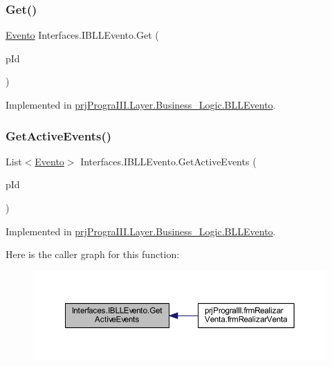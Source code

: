 \subsubsection{\texorpdfstring{Get()}{Get()}}
{\footnotesize\ttfamily \hyperlink{classprj_progra_i_i_i_1_1_layer_1_1_entities_1_1_evento}{Evento} Interfaces.\+I\+B\+L\+L\+Evento.\+Get (\begin{DoxyParamCaption}\item[{int}]{p\+Id }\end{DoxyParamCaption})}



Implemented in \hyperlink{classprj_progra_i_i_i_1_1_layer_1_1_business___logic_1_1_b_l_l_evento_a7aeead199812f2510ee3087a7d022c4e}{prj\+Progra\+I\+I\+I.\+Layer.\+Business\+\_\+\+Logic.\+B\+L\+L\+Evento}.

\hypertarget{interface_interfaces_1_1_i_b_l_l_evento_ace54abf5be3a6b759890104aeebd6d62}{}\label{interface_interfaces_1_1_i_b_l_l_evento_ace54abf5be3a6b759890104aeebd6d62} 
\subsubsection{\texorpdfstring{Get\+Active\+Events()}{GetActiveEvents()}}
{\footnotesize\ttfamily List$<$\hyperlink{classprj_progra_i_i_i_1_1_layer_1_1_entities_1_1_evento}{Evento}$>$ Interfaces.\+I\+B\+L\+L\+Evento.\+Get\+Active\+Events (\begin{DoxyParamCaption}\item[{Date\+Time}]{p\+Id }\end{DoxyParamCaption})}



Implemented in \hyperlink{classprj_progra_i_i_i_1_1_layer_1_1_business___logic_1_1_b_l_l_evento_a72838525485eaff7c98c698dac7e5f71}{prj\+Progra\+I\+I\+I.\+Layer.\+Business\+\_\+\+Logic.\+B\+L\+L\+Evento}.

Here is the caller graph for this function\+:
\nopagebreak
\begin{figure}[H]
\begin{center}
\leavevmode
\includegraphics[width=350pt]{interface_interfaces_1_1_i_b_l_l_evento_ace54abf5be3a6b759890104aeebd6d62_icgraph}
\end{center}
\end{figure}
\hypertarget{interface_interfaces_1_1_i_b_l_l_evento_a2573cdfaf0097cfcf185b39ddaede2d8}{}\label{interface_interfaces_1_1_i_b_l_l_evento_a2573cdfaf0097cfcf185b39ddaede2d8} 
